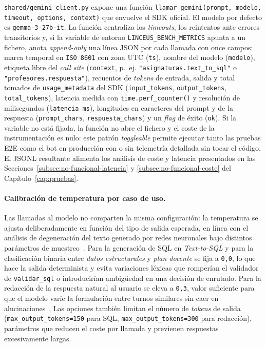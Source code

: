 \texttt{shared/gemini\_client.py} expone una función \texttt{llamar\_gemini(prompt, modelo, timeout, options, context)} que envuelve el SDK oficial. El modelo por defecto es \texttt{gemma-3-27b-it}. La función centraliza los \textit{timeouts}, los reintentos ante errores transitorios y, si la variable de entorno \texttt{LINCEUS\_BENCH\_METRICS} apunta a un fichero, anota \textit{append-only} una línea JSON por cada llamada con once campos: marca temporal en \texttt{ISO~8601} con zona UTC (\texttt{ts}), nombre del modelo (\texttt{modelo}), etiqueta libre del \textit{call site} (\texttt{context}, p.~ej. \texttt{"asignaturas.text\_to\_sql"} o \texttt{"profesores.respuesta"}), recuentos de \textit{tokens} de entrada, salida y total tomados de \texttt{usage\_metadata} del SDK (\texttt{input\_tokens}, \texttt{output\_tokens}, \texttt{total\_tokens}), latencia medida con \texttt{time.perf\_counter()} y resolución de milisegundos (\texttt{latencia\_ms}), longitudes en caracteres del prompt y de la respuesta (\texttt{prompt\_chars}, \texttt{respuesta\_chars}) y un \textit{flag} de éxito (\texttt{ok}). Si la variable no está fijada, la función no abre el fichero y el coste de la instrumentación es nulo: este patrón \textit{toggleable} permite ejecutar tanto las pruebas E2E como el bot en producción con o sin telemetría detallada sin tocar el código. El JSONL resultante alimenta los análisis de coste y latencia presentados en las Secciones~\ref{subsec:no-funcional-latencia} y \ref{subsec:no-funcional-coste} del Capítulo~\ref{cap:pruebas}.

\paragraph{Calibración de temperatura por caso de uso.} Las llamadas al modelo no comparten la misma configuración: la temperatura se ajusta deliberadamente en función del tipo de salida esperada, en línea con el análisis de degeneración del texto generado por redes neuronales bajo distintos parámetros de muestreo~\cite{holtzman2020curious}. Para la generación de SQL en \textit{Text-to-SQL} y para la clasificación binaria entre \textit{datos estructurales} y \textit{plan docente} se fija a \texttt{0,0}, lo que hace la salida determinista y evita variaciones léxicas que romperían el validador de \texttt{validar\_sql} o introducirían ambigüedad en una decisión de enrutado. Para la redacción de la respuesta natural al usuario se eleva a \texttt{0,3}, valor suficiente para que el modelo varíe la formulación entre turnos similares sin caer en alucinaciones~\cite{ji2023survey}. Las opciones también limitan el número de \textit{tokens} de salida (\texttt{max\_output\_tokens=150} para SQL, \texttt{max\_output\_tokens=300} para redacción), parámetros que reducen el coste por llamada y previenen respuestas excesivamente largas.

